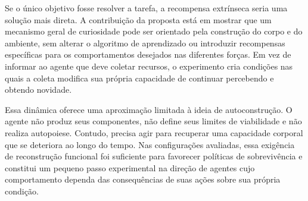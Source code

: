 Se o único objetivo fosse resolver a tarefa, a recompensa extrínseca seria uma solução mais direta. A contribuição da proposta está em mostrar que um mecanismo geral de curiosidade pode ser orientado pela construção do corpo e do ambiente, sem alterar o algoritmo de aprendizado ou introduzir recompensas específicas para os comportamentos desejados nas diferentes forças. Em vez de informar ao agente que deve coletar recursos, o experimento cria condições nas quais a coleta modifica sua própria capacidade de continuar percebendo e obtendo novidade.

Essa dinâmica oferece uma aproximação limitada à ideia de autoconstrução. O agente não produz seus componentes, não define seus limites de viabilidade e não realiza autopoiese. Contudo, precisa agir para recuperar uma capacidade corporal que se deteriora ao longo do tempo. Nas configurações avaliadas, essa exigência de reconstrução funcional foi suficiente para favorecer políticas de sobrevivência e constitui um pequeno passo experimental na direção de agentes cujo comportamento dependa das consequências de suas ações sobre sua própria condição.
